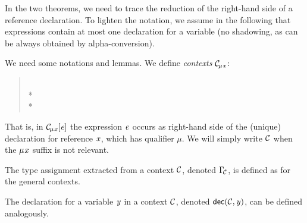 {In the two theorems, we need to trace the reduction of the right-hand side of a reference declaration.  
 To lighten the notation, we assume in the following that expressions contain at most one declaration for a variable (no shadowing, as can be always obtained by alpha-conversion).


We need some notations and lemmas. We define \emph{contexts} ${\cal C}\!_{\mu\hspace{.015cm}\mathit{x}}$:

\begin{quote}
\begin{grammatica}
\\*
\\*
\end{grammatica}
\end{quote}

That is, in ${\cal C}\!_{\mu\hspace{.015cm}\mathit{x}}[\mathit{e}]$ the expression $\mathit{e}$ occurs as right-hand side of the (unique) declaration for reference $\mathit{x}$, which has qualifier $\mu$. We will simply write ${\cal{C}}$ when the $\mu\hspace{.015cm}\mathit{x}$ suffix is not relevant.  


The type assignment extracted from a context ${\cal{C}}$, denoted $\Gamma_{\!{\cal{C}}}$, is defined as for the general contexts.
 
 The declaration for a variable $\mathit{y}$ in a context ${\cal{C}}$, denoted $\textsf{dec}({\cal{C}},\mathit{y})$, can be defined analogously.
 
}
